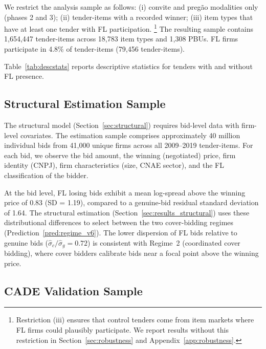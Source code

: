 We restrict the analysis sample as follows: (i) convite and preg\~ao
modalities only (phases 2 and 3); (ii) tender-items with a recorded
winner; (iii) item types that have at least one tender with FL
participation.%
\footnote{Restriction (iii) ensures that control tenders come from item
markets where FL firms could plausibly participate. We report results
without this restriction in Section~\ref{sec:robustness} and
Appendix~\ref{app:robustness}.}
The resulting sample contains 1,654,447 tender-items across 18,783
item types and 1,308 PBUs. FL firms participate in 4.8\% of
tender-items (79,456 tender-items).

Table~\ref{tab:descstats} reports descriptive statistics for tenders
with and without FL presence.



\subsection{Structural Estimation Sample} %
\label{sec:structural_sample}

The structural model (Section~\ref{sec:structural}) requires bid-level
data with firm-level covariates. The estimation sample comprises
approximately 40 million individual bids from 41,000 unique firms across
all 2009--2019 tender-items. For each bid, we observe the bid amount,
the winning (negotiated) price, firm identity (CNPJ), firm
characteristics (size, CNAE sector), and the FL classification of the
bidder.

At the bid level, FL losing bids exhibit a mean log-spread above the %
winning price of 0.83 (SD = 1.19), compared to a genuine-bid residual
standard deviation of 1.64. The structural estimation
(Section~\ref{sec:results_structural}) uses these distributional
differences to select between the two cover-bidding regimes
(Prediction~\ref{pred:regime_v6}). The lower dispersion of FL bids
relative to genuine bids ($\hat{\sigma}_c / \hat{\sigma}_g = 0.72$)
is consistent with Regime~2 (coordinated cover bidding), where cover
bidders calibrate bids near a focal point above the winning price.

\subsection{CADE Validation Sample} %
\label{sec:cade_sample}

